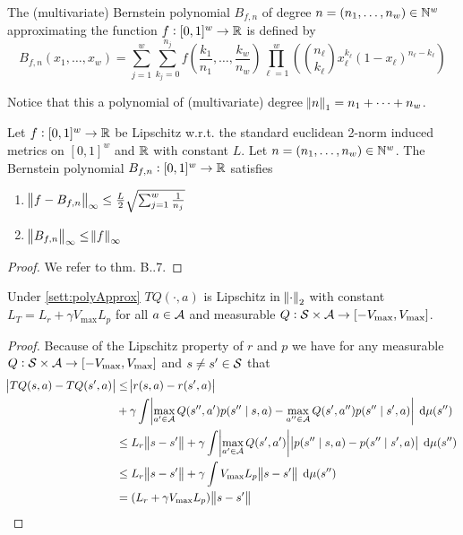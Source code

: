 \begin{defn}
  The (multivariate) Bernstein polynomial $B_{f, n}$ of degree
  $n=(n_1, \dots, n_w) \in \mathbb{N}^w$ approximating the function $f:[0,1]^w \to \mathbb{R}$
  is defined by
  \begin{equation*}
    B_{f, n}(x_1, \dots, x_w) =
    \sum_{j = 1}^w \sum_{k_j = 0}^{n_j}
    f\left( \frac{k_1}{n_1}, \dots, \frac{k_w}{n_w} \right)
    \prod_{\ell = 1}^w \left(
    \binom{n_\ell}{k_\ell} x_\ell^{k_\ell}(1-x_\ell)^{n_\ell - k_\ell} \right)
  \end{equation*}
  \label{defn:Bfn}
\end{defn}
Notice that this a polynomial of (multivariate) degree
$\norm{n}_1 = n_1 + \dots + n_w$.

\begin{thm}
  Let $f : [0,1]^w \to \mathbb{R}$ be Lipschitz
  w.r.t. the standard euclidean 2-norm induced metrics on $[0,1]^w$ and $\mathbb{R}$
  with constant $L$. 
  Let $n = (n_1, \dots, n_w) \in \mathbb{N}^w$.
  The Bernstein polynomial
  $B_{f,n} : [0,1]^w \to \mathbb{R}$ satisfies
  \begin{enumerate}
    \item $\norm{f - B_{f,n}}_\infty
      \leq \frac{L}{2} \sqrt{\sum_{j=1}^w \frac{1}{n_j}}$
    \item $\norm{B_{f,n}}_\infty \leq \norm{f}_\infty$
  \end{enumerate}
  \label{thm:bernsteinApprox}
\end{thm}
\begin{proof}
  We refer to  thm. B..7.
\end{proof}

\begin{lem}
  Under \cref{sett:polyApprox} 
  $TQ(\cdot, a)$ is Lipschitz in $\norm{\cdot}_2$ with constant
  $ L_T = L_r + \gamma V_{\max} L_p $
  for all $a \in \mathcal{A}$ and measurable
  $Q : \mathcal{S} \times \mathcal{A} \to [-V_{\max},V_{\max}]$.
  \label{lem:bernsteinLem}
\end{lem}
\begin{proof}
  Because of the Lipschitz property of $r$ and $p$ we have
  for any measurable $Q : \mathcal{S} \times \mathcal{A} \to [-V_{\max},V_{\max}]$
  and $s \neq s' \in \mathcal{S}$ that
  \begin{align*}
    \abs{TQ(s, a) - TQ(s', a)}
    &\leq \abs{r(s, a) - r(s', a)} 
    \\ &+ \gamma \int
    \abs{\max_{a'\in\mathcal{A}}Q(s'', a') p(s'' \mid s, a)
    - \max_{a'' \in \mathcal{A}} Q(s', a'') p(s'' \mid s', a) }
    \; \mathrm{d} \mu(s'')
    \\ &\leq L_r \norm{s - s'} + \gamma \int
    \abs{\max_{a'\in\mathcal{A}}Q(s', a')}
    \abs{p(s'' \mid s, a) - p(s'' \mid s', a)}
    \; \mathrm{d} \mu(s'')
    \\ &\leq L_r \norm{s - s'} + \gamma \int
    V_{\max}
    L_p \norm{s - s'}
    \; \mathrm{d} \mu(s'')
    \\ & = (L_r + \gamma V_{\max} L_p) \norm{s - s'}
  \end{align*}
\end{proof}

